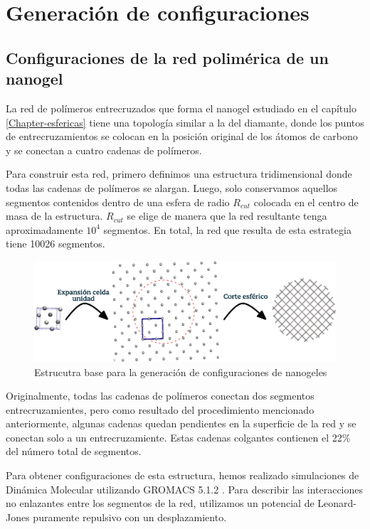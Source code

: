 \chapter{Generaci\'on de configuraciones}\label{anexo-configuraciones}



\section{Configuraciones de la red polim\'erica de un nanogel}

La red de pol\'imeros entrecruzados que forma el nanogel estudiado en el cap\'itulo \ref{Chapter-esfericas} tiene una topolog\'ia similar a la del diamante, donde los puntos de entrecruzamientos se colocan en la posici\'on original de los \'atomos de carbono y se conectan a cuatro cadenas de pol\'imeros.

Para construir esta red, primero definimos una estructura tridimensional donde todas las cadenas de pol\'imeros se alargan. Luego, solo conservamos aquellos segmentos contenidos dentro de una esfera de radio $R_{cut}$ colocada en el centro de masa de la estructura. $R_{cut}$ se elige de manera que la red resultante tenga aproximadamente $10^4$ segmentos. En total, la red que resulta de esta estrategia tiene 10026 segmentos.

\begin{figure}[!ht]
	\centering
	\includegraphics[width=0.90\linewidth]{Figures/graph-anexos/esquema.pdf}
	\caption{Estrucutra base para la generaci\'on de configuraciones de nanogeles}
	\label{fig:anexo:equema-gel}
\end{figure}




Originalmente, todas las cadenas de pol\'imeros conectan dos segmentos entrecruzamientes, pero como resultado del procedimiento mencionado anteriormente, algunas cadenas quedan pendientes en la superficie de la red y se conectan solo a un entrecruzamiente. Estas cadenas colgantes contienen el 22\% del n\'umero total de segmentos.

Para obtener configuraciones de esta estructura, hemos realizado simulaciones de Din\'amica Molecular utilizando GROMACS 5.1.2 \cite{lindahl2001gromacs}.
Para describir las interacciones no enlazantes entre los segmentos de la red, utilizamos un potencial de Leonard-Jones puramente repulsivo con un desplazamiento.

